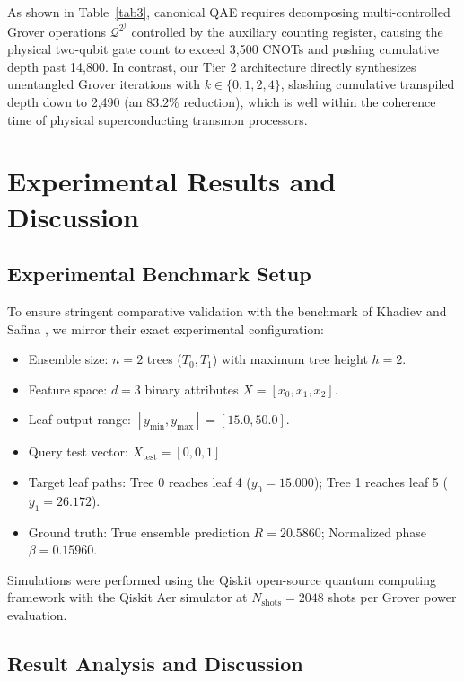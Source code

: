 \documentclass[sn-mathphys,Numbered]{sn-jnl}
\theoremstyle{thmstyleone}
\theoremstyle{thmstyletwo}
\theoremstyle{thmstylethree}
\begin{document}
As shown in Table~\ref{tab3}, canonical QAE requires decomposing multi-controlled Grover operations $\mathcal{Q}^{2^j}$ controlled by the auxiliary counting register, causing the physical two-qubit gate count to exceed 3,500 CNOTs and pushing cumulative depth past 14,800. In contrast, our Tier 2 architecture directly synthesizes unentangled Grover iterations with $k \in \{0, 1, 2, 4\}$, slashing cumulative transpiled depth down to 2,490 (an $83.2\%$ reduction), which is well within the coherence time of physical superconducting transmon processors.

\section{Experimental Results and Discussion}\label{sec6}

\subsection{Experimental Benchmark Setup}\label{subsec6.1}

To ensure stringent comparative validation with the benchmark of Khadiev and Safina \cite{khadiev2026quantum}, we mirror their exact experimental configuration:
\begin{itemize}
    \item Ensemble size: $n = 2$ trees ($T_0, T_1$) with maximum tree height $h = 2$.
    \item Feature space: $d = 3$ binary attributes $X = [x_0, x_1, x_2]$.
    \item Leaf output range: $[y_{\min}, y_{\max}] = [15.0, 50.0]$.
    \item Query test vector: $X_{\text{test}} = [0, 0, 1]$.
    \item Target leaf paths: Tree 0 reaches leaf 4 ($y_0 = 15.000$); Tree 1 reaches leaf 5 ($y_1 = 26.172$).
    \item Ground truth: True ensemble prediction $R = 20.5860$; Normalized phase $\beta = 0.15960$.
\end{itemize}
Simulations were performed using the Qiskit open-source quantum computing framework \cite{aleksandrowicz2019qiskit} with the Qiskit Aer simulator at $N_{\text{shots}} = 2048$ shots per Grover power evaluation.

\subsection{Result Analysis and Discussion}\label{subsec6.2}
\end{document}
